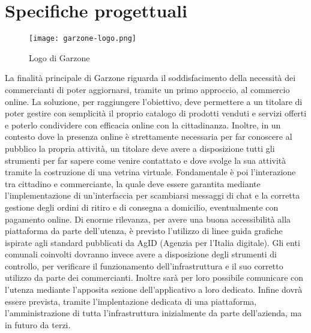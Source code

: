\section{Specifiche progettuali}
\begin{figure}[!htb]
    \centering
    \texttt{[image: garzone-logo.png]}
    \caption{Logo di Garzone}
\end{figure}
La finalità principale di Garzone riguarda il soddisfacimento della necessità dei commercianti di poter aggiornarsi, tramite un primo approccio, al commercio online. La soluzione, per raggiungere l'obiettivo, deve permettere a un titolare di poter gestire con semplicità il proprio catalogo di prodotti venduti e servizi offerti e poterlo condividere con efficacia online con la cittadinanza. Inoltre, in un contesto dove la presenza online è strettamente necessaria per far conoscere al pubblico la propria attività, un titolare deve avere a disposizione tutti gli strumenti per far sapere come venire contattato e dove svolge la sua attività tramite la costruzione di una vetrina virtuale. Fondamentale è poi l'interazione tra cittadino e commerciante, la quale deve essere garantita mediante l'implementazione di un'interfaccia per scambiarsi messaggi di chat e la corretta gestione degli ordini di ritiro e di consegna a domicilio, eventualmente con pagamento online. Di enorme rilevanza, per avere una buona accessibilità alla piattaforma da parte dell'utenza, è previsto l'utilizzo di linee guida grafiche ispirate agli standard pubblicati da AgID (Agenzia per l'Italia digitale). Gli enti comunali coinvolti dovranno invece avere a disposizione degli strumenti di controllo, per verificare il funzionamento dell'infrastruttura e il suo corretto utilizzo da parte dei commercianti. Inoltre sarà per loro possibile comunicare con l'utenza mediante l'apposita sezione dell'applicativo a loro dedicato. Infine dovrà essere prevista, tramite l'implentazione dedicata di una piattaforma, l'amministrazione di tutta l'infrastruttura inizialmente da parte dell'azienda, ma in futuro da terzi. 
